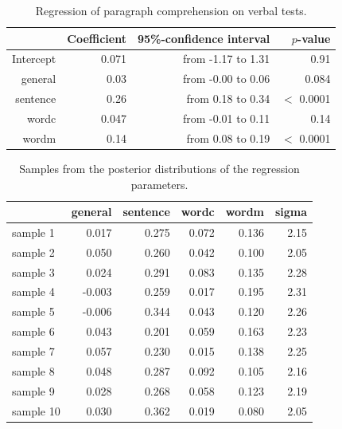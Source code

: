 \documentclass[11pt,a4paper,twoside]{book}\usepackage[]{graphicx}\usepackage[]{color}
\newenvironment{knitrout}{}{} %
\begin{document}
\begin{table}[!h]
\centering
\caption{Regression of paragraph comprehension on verbal tests.} 
\label{tbl:empirical.reg}
\begingroup\footnotesize
\begin{tabular}{rrrr}
  \hline
 & Coefficient & 95\%-confidence interval & $p$-value \\ 
  \hline
Intercept & 0.071 & from -1.17 to 1.31 & 0.91 \\ 
  general & 0.03 & from -0.00 to 0.06 & 0.084 \\ 
  sentence & 0.26 & from 0.18 to 0.34 & $<$ 0.0001 \\ 
  wordc & 0.047 & from -0.01 to 0.11 & 0.14 \\ 
  wordm & 0.14 & from 0.08 to 0.19 & $<$ 0.0001 \\ 
   \hline
\end{tabular}
\endgroup
\end{table}


\begin{knitrout}
\color{fgcolor}\begin{table}

\caption{\label{tab:empirical.data.postsample2}Samples from the posterior distributions of the regression parameters.}
\centering
\begin{tabular}[t]{lrrrrr}
\toprule
  & general & sentence & wordc & wordm & sigma\\
\midrule
sample 1 & 0.017 & 0.275 & 0.072 & 0.136 & 2.15\\
sample 2 & 0.050 & 0.260 & 0.042 & 0.100 & 2.05\\
sample 3 & 0.024 & 0.291 & 0.083 & 0.135 & 2.28\\
sample 4 & -0.003 & 0.259 & 0.017 & 0.195 & 2.31\\
sample 5 & -0.006 & 0.344 & 0.043 & 0.120 & 2.26\\
sample 6 & 0.043 & 0.201 & 0.059 & 0.163 & 2.23\\
sample 7 & 0.057 & 0.230 & 0.015 & 0.138 & 2.25\\
sample 8 & 0.048 & 0.287 & 0.092 & 0.105 & 2.16\\
sample 9 & 0.028 & 0.268 & 0.058 & 0.123 & 2.19\\
sample 10 & 0.030 & 0.362 & 0.019 & 0.080 & 2.05\\
\bottomrule
\end{tabular}
\end{table}


\end{knitrout}
\end{document}
